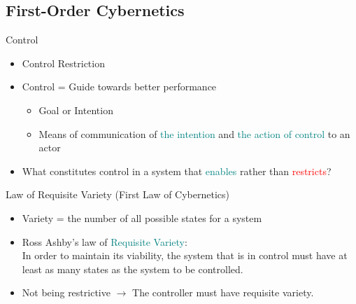 \documentclass[
	11pt,
	aspectratio=169,
]{beamer}
\begin{document}
        \subsection{First-Order Cybernetics}
            \begin{frame}{Control}
                \begin{itemize}
                    \item<1-> Control \neq Restriction
                    \item<2-> Control = Guide towards better performance
                    \begin{itemize}
                        \item Goal or Intention
                        \item Means of communication of \textcolor{teal}{the intention} and \textcolor{teal}{the action of control} to an actor
                    \end{itemize}
                    \item<3-> What constitutes control in a system that \textcolor{teal}{enables} rather than \textcolor{red}{restricts}?
                \end{itemize}
            \end{frame}
            \begin{frame}{Law of Requisite Variety (First Law of Cybernetics)}
                \begin{itemize}
                    \item<1-> Variety = the number of all possible states for a system
                    \item<2-> Ross Ashby's law of \textcolor{teal}{Requisite Variety}: \\
                        In order to maintain its viability, the system that is in control must have at least as many states as the system to be controlled.
                    \item<3-> Not being restrictive $\longrightarrow$ The controller must have requisite variety.
                \end{itemize}
            \end{frame}
\end{document}
